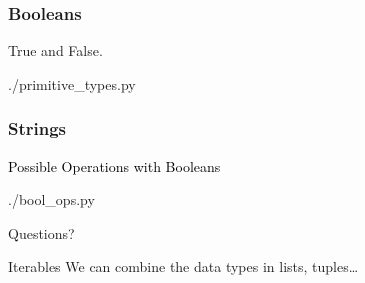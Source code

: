 \documentclass{beamer}
\begin{document}
\begin{frame}
  \frametitle{Booleans}
  True and False.
  \begin{lstinputlisting}[firstline=14, lastline=15]
    {./primitive_types.py}
  \end{lstinputlisting}
\end{frame}

\begin{frame}
  \frametitle{Strings}
  \textcolor{black}{\large{Possible Operations with Booleans}}
  \begin{lstinputlisting}
    {./bool_ops.py}
  \end{lstinputlisting}
\end{frame}

\begin{frame}[plain, c]
  \begin{center}
    Questions?
  \end{center}
\end{frame}

\begin{frame}{Iterables}
  We can combine the data types in lists, tuples\ldots
\end{frame}
\end{document}
